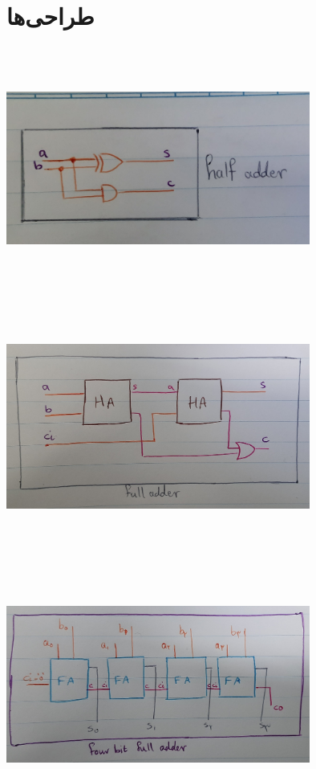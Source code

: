 \documentclass[dvipsnames, svgnames, x11names, a4paper, 11pt, oneside]{book}
\begin{document}
				\section{طراحی‌ها}
					\begin{center}
						\includegraphics[width=10cm, height=8cm]{./images/adders1}
					\end{center}
				
					\begin{center}
						\includegraphics[width=10cm, height=8cm]{./images/adders2}
					\end{center}
					
					\begin{center}
						\includegraphics[width=10cm, height=8cm]{./images/adders3}
					\end{center}
				
\end{document}
